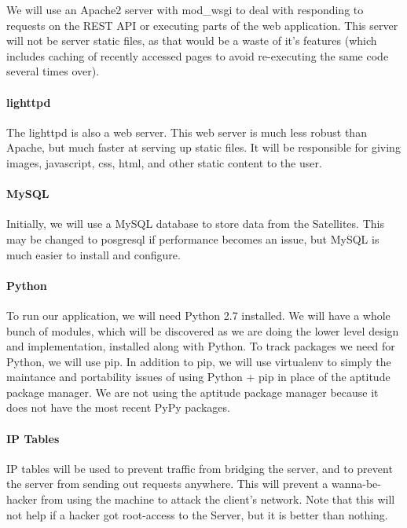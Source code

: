 We will use an Apache2 server with mod\_wsgi to deal with responding to requests on the REST API or executing parts of the web application.
This server will not be server static files, as that would be a waste of it's features (which includes caching of recently accessed pages to avoid re-executing the same code several times over).

\paragraph{lighttpd}

The lighttpd is also a web server.
This web server is much less robust than Apache, but much faster at serving up static files.
It will be responsible for giving images, javascript, css, html, and other static content to the user.

\paragraph{MySQL}

Initially, we will use a MySQL database to store data from the Satellites.
This may be changed to posgresql if performance becomes an issue, but MySQL is much easier to install and configure.

\paragraph{Python}

To run our application, we will need Python 2.7 installed.
We will have a whole bunch of modules, which will be discovered as we are doing the lower level design and implementation, installed along with Python.
To track packages we need for Python, we will use pip.
In addition to pip, we will use virtualenv to simply the maintance and portability issues of using Python + pip in place of the aptitude package manager.
We are not using the aptitude package manager because it does not have the most recent PyPy packages.

\paragraph{IP Tables}

IP tables will be used to prevent traffic from bridging the server, and to prevent the server from sending out requests anywhere.
This will prevent a wanna-be-hacker from using the machine to attack the client's network.
Note that this will not help if a hacker got root-access to the Server, but it is better than nothing.

